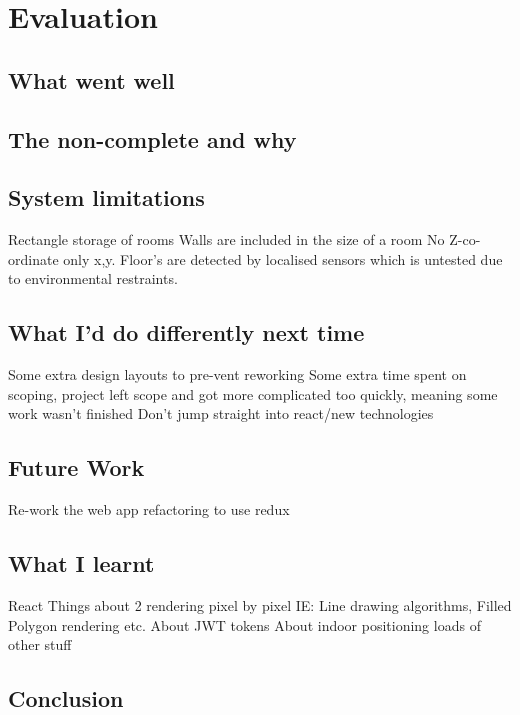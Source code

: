 \section{Evaluation}

\subsection{What went well} %

\subsection{The non-complete and why}

\subsection{System limitations} 
Rectangle storage of rooms
Walls are included in the size of a room
No Z-co-ordinate only x,y. Floor's are detected by localised sensors which is untested due to environmental restraints.

\subsection{What I'd do differently next time}
Some extra design layouts to pre-vent reworking
Some extra time spent on scoping, project left scope and got more complicated too quickly, meaning some work wasn't finished
Don't jump straight into react/new technologies

\subsection{Future Work}
Re-work the web app refactoring to use redux

\subsection{What I learnt} %
React
Things about 2 rendering pixel by pixel IE: Line drawing algorithms, Filled Polygon rendering etc.
About JWT tokens
About indoor positioning
loads of other stuff

\subsection{Conclusion}
